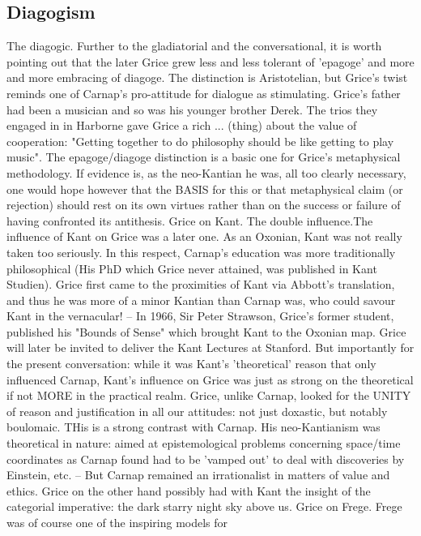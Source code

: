 \documentclass[10pt,titlepage]{book}
\begin{document}
{\subsection{Diagogism}

The  diagogic. Further to the gladiatorial and the 
conversational, it is  worth  pointing out that the later Grice grew less and less 
tolerant of 'epagoge'   and more and more embracing of diagoge. The distinction is 
Aristotelian,  but  Grice's twist reminds one of Carnap's pro-attitude for 
dialogue  as   stimulating. Grice's  father had been a musician and so was 
his younger brother Derek.  The trios  they engaged in in Harborne gave Grice 
a rich ... (thing) about the value of  cooperation: "Getting together to do 
philosophy should be like getting  to  play music". The epagoge/diagoge 
distinction is a basic one for Grice's  metaphysical  methodology. If evidence 
is, as the neo-Kantian he was, all  too clearly  
necessary, one would hope however that the BASIS for this  or that 
metaphysical  claim (or rejection) should rest on its own virtues  rather than on 
the success  or failure of having confronted its  antithesis. 
Grice  on Kant. The  double influence.The influence of Kant on Grice was a 
later one. As an Oxonian,  Kant was not really taken too seriously. In this 
respect, Carnap's education was  more traditionally philosophical (His PhD 
which Grice never attained, was  published in Kant Studien). Grice first came 
to the proximities of Kant via  Abbott's translation, and thus he was more 
of a minor Kantian than Carnap was,  who could savour Kant in the 
vernacular! -- In 1966, Sir Peter Strawson, Grice's  former student, published his 
"Bounds of Sense" which brought Kant to the  Oxonian map. Grice will later be 
invited to deliver the Kant Lectures at  Stanford. But  importantly for the 
present conversation: while it was Kant's 'theoretical'  reason that only 
influenced Carnap, Kant's influence on Grice was just as strong  on the 
theoretical if not MORE in the practical realm. Grice, unlike  Carnap, looked for 
the UNITY of reason and justification in all  our attitudes: not just 
doxastic, but notably boulomaic. THis is a strong  contrast with Carnap. His 
neo-Kantianism was theoretical in nature: aimed at  epistemological problems 
concerning space/time coordinates as Carnap  found had to be 'vamped out' to deal 
with discoveries by Einstein, etc.  -- But Carnap remained an irrationalist 
in matters of value and  ethics. Grice on the other hand possibly had with 
Kant the insight of the  categorial imperative: the dark starry night sky 
above us. 
Grice  on Frege. Frege was of course one of the inspiring models for 

}
\end{document}
